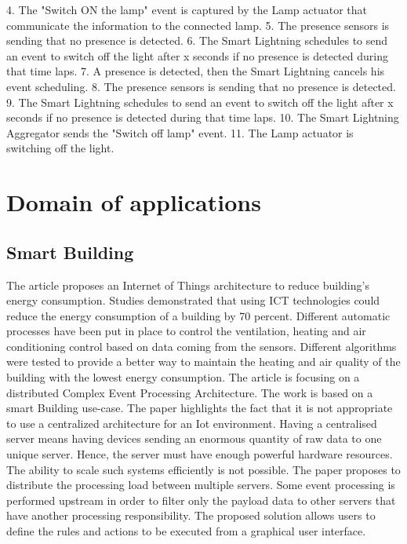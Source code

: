 \documentclass[11pt]{article}
\begin{document}
4. The "Switch ON the lamp" event is captured by the Lamp actuator that communicate the information to the connected lamp. 
5. The presence sensors is sending that no presence is detected. 
6. The Smart Lightning schedules to send an event to switch off the light after x seconds if no presence is detected during that time laps.
7. A presence is detected, then the Smart Lightning cancels his event scheduling.
8. The presence sensors is sending that no presence is detected. 
9. The Smart Lightning schedules to send an event to switch off the light after x seconds if no presence is detected during that time laps.
10. The Smart Lightning Aggregator sends the "Switch off lamp" event.
11. The Lamp actuator is switching off the light.

\section{Domain of applications} \label{domain-applications}

\subsection{Smart Building}

The article \cite{Towards-a-context-driven-platform} proposes an Internet of Things architecture to reduce building's energy consumption. Studies demonstrated that using ICT technologies could reduce the energy consumption of a building by 70 percent. Different automatic processes have been put in place to control the ventilation, heating and air conditioning control based on data coming from the sensors. Different algorithms were tested to provide a better way to maintain the heating and air quality of the building with the lowest energy consumption.
\newline
\newline
The article \cite{Complex-event-processing-for-the-Internet-of-Things} is focusing on a distributed Complex Event Processing Architecture. The work is based on a smart Building use-case. The paper highlights the fact that it is not appropriate to use a centralized architecture for an Iot environment. Having a centralised server means having devices sending an enormous quantity of raw data to one unique server. Hence, the server must have enough powerful hardware resources. The ability to scale such systems efficiently is not possible. The paper proposes to distribute the processing load between multiple servers. Some event processing is performed upstream in order to filter only the payload data to other servers that have another processing responsibility. The proposed solution allows users to define the rules and actions to be executed from a graphical user interface.
\end{document}
